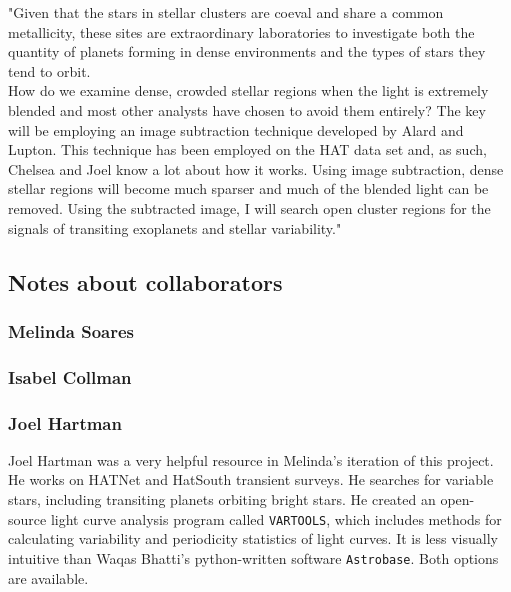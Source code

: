  "Given that the stars in stellar clusters are coeval and share a common metallicity, these sites are extraordinary laboratories to investigate both the quantity of planets forming in dense environments and the types of stars they tend to orbit.\\ 
 How do we examine dense, crowded stellar regions when the light is extremely blended and most other analysts have chosen to avoid them entirely?  The key will be employing an image subtraction technique developed by Alard and Lupton. This technique has been employed on the HAT data set and, as such, Chelsea and Joel know a lot about how it works. Using image subtraction, dense stellar regions will become much sparser and much of the blended light can be removed. Using the subtracted image,  I will search open cluster regions for the signals of transiting exoplanets and stellar variability."\\ 

\subsection*{Notes about collaborators}
\subsubsection{Melinda Soares}

\subsubsection{Isabel Collman}

\subsubsection{Joel Hartman}
 Joel Hartman was a very helpful resource in Melinda's iteration of this project. He  works on HATNet and HatSouth transient surveys. He searches for variable stars, including transiting planets orbiting bright stars. He created an open-source light curve analysis program called \texttt{VARTOOLS}, which includes methods for calculating variability and periodicity statistics of light curves. It is less visually intuitive than Waqas Bhatti's python-written software \texttt{Astrobase}. Both options are available.
